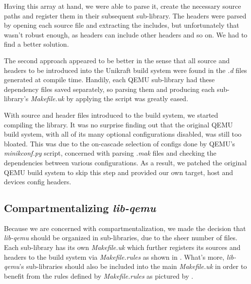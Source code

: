 Having this array at hand, we were able to parse it, create the necessary source paths and register them in their subsequent sub-library.
The headers were parsed by opening each source file and extracting the includes, but unfortunately that wasn't robust enough, as headers can include other headers and so on.
We had to find a better solution.

The second approach appeared to be better in the sense that all source and headers to be introduced into the Unikraft build system were found in the \textit{.d} files generated at compile time.
Handily, each QEMU sub-library had these dependency files saved separately, so parsing them and producing each sub-library's \textit{Makefile.uk} by applying the  script was greatly eased.

With source and header files introduced to the build system, we started compiling the library.
It was no surprise finding out that the original QEMU build system, with all of its many optional configurations disabled, was still too bloated.
This was due to the on-cascade selection of configs done by QEMU's \textit{minikconf.py} script, concerned with parsing \textit{.mak} files and checking the dependencies between various configurations.
As a result, we patched the original QEMU build system to skip this step and provided our own target, host and devices config headers. 

\subsection{Compartmentalizing \textit{lib-qemu}}
\label{subsec:compartmentalizing-qemu}

Because we are concerned with compartmentalization, we made the decision that \textit{lib-qemu} should be organized in sub-libraries, due to the sheer number of files.
Each sub-library has its own \textit{Makefile.uk} which further registers its sources and headers to the build system via \textit{Makefile.rules} as shown in .
What's more, \textit{lib-qemu}'s sub-libraries should also be included into the main \textit{Makefile.uk} in order to benefit from the rules defined by \textit{Makefile.rules} as pictured by .


